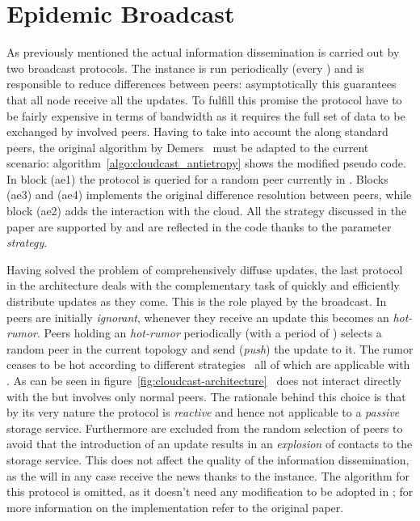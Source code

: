 \section{Epidemic Broadcast}
As previously mentioned the actual information dissemination is
carried out by two \epidemic broadcast protocols. The
\antientropy instance is run periodically (every \deltaAntiEntropy)
and is responsible to
reduce differences between peers: asymptotically this guarantees that
all node receive all the updates. To fulfill this promise the
protocol have to be fairly expensive in terms of bandwidth as it
requires the full set of data to be exchanged by involved
peers. Having to take into account the \cloud along standard peers,
the original algorithm by Demers~\cite{EpidemicAlgorithms} must be
adapted to the current scenario:
algorithm~\ref{algo:cloudcast_antietropy} shows the modified pseudo
code.
In block (ae1) the \cloudcast \peersampling protocol is queried
for a random peer currently in \view. Blocks (ae3) and (ae4)
implements the original difference resolution between peers, while
block (ae2) adds the interaction with the cloud.
All the strategy discussed in the paper are supported by
\cloudcast and are reflected in the code thanks to the parameter
\emph{strategy}.



Having solved the problem of comprehensively diffuse updates, the last
protocol in the architecture deals with the complementary task of
quickly and efficiently distribute updates as they come. This is the
role played by the \rumormongering \epidemic broadcast.
In \rumormongering peers are initially \emph{ignorant}, whenever they
receive an update this becomes an \emph{hot-rumor}. Peers holding an
\emph{hot-rumor} periodically (with a period of \deltaRumorMongering)
selects a random peer in the current
topology and send (\emph{push}) the update to it. The rumor ceases to
be hot according to different strategies~\cite{EpidemicAlgorithms}
 all of which are applicable with \cloudcast.
As can be seen in figure~\ref{fig:cloudcast-architecture} \rumormongering\
does not interact directly with the \cloud but involves only normal
peers. The rationale behind this choice is that by its very nature the
protocol is \emph{reactive} and hence not applicable to a
\emph{passive} storage service. Furthermore \cloud \descriptor are
excluded from the random selection of peers to avoid that the
introduction of an update results in an \emph{explosion} of contacts
to the storage service. This does not affect the quality of the
information dissemination, as the \cloud will in any case receive the
news thanks to the \antientropy instance.
The algorithm for this protocol is omitted, as it doesn't need any
modification to be adopted in \cloudcast; for more information on the
implementation refer to the original paper\cite{EpidemicAlgorithms}.

